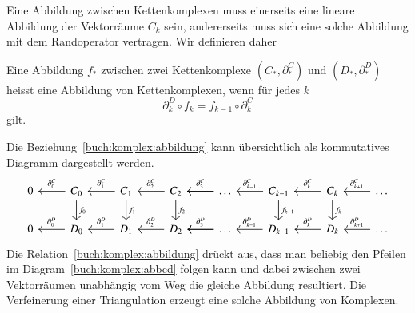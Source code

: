 Eine Abbildung zwischen Kettenkomplexen muss einerseits eine lineare
Abbildung der Vektorräume $C_k$ sein, andererseits muss sich eine
solche Abbildung mit dem Randoperator vertragen.
Wir definieren daher

\begin{definition}
\label{buch:komplex:def:abbildung}
Eine Abbildung $f_*$ zwischen zwei Kettenkomplexe $(C_*,\partial^C_*)$ und 
$(D_*,\partial^D_*)$ heisst eine Abbildung von Kettenkomplexen, wenn
für jedes $k$ 
\begin{equation}
\partial^D_k
\circ
f_{k}
=
f_{k-1}
\circ
\partial^C_k
\label{buch:komplex:abbildung}
\end{equation}
gilt.
\end{definition}

Die Beziehung~\eqref{buch:komplex:abbildung} kann übersichtlich als
kommutatives Diagramm dargestellt werden.
\begin{equation}
\begin{tikzcd}
0 
	& C_0 \arrow[l, "\partial_0^C" above]
		\arrow[d, "f_0"]
		& C_1 \arrow[l,"\partial_1^C" above]
			\arrow[d, "f_1"]
			& C_2 \arrow[l,"\partial_2^C" above]
				\arrow[d, "f_2"]
				& \dots \arrow[l]
					\arrow[l, "\partial_{3}^C" above]
					& C_{k-1}
						\arrow[l, "\partial_{k-1}^C" above]
						\arrow[d, "f_{k-1}"]
						& C_{k}\arrow[l, "\partial_{k}^C" above]
							\arrow[d, "f_{k}"]
							& \dots
								\arrow[l,"\partial_{k+1}^C" above]
\\
0 
	& D_0 \arrow[l, "\partial_0^D" above]
		& D_1 \arrow[l,"\partial_1^D" above]
			& D_2 \arrow[l,"\partial_2^D" above]
				& \dots \arrow[l]
					\arrow[l, "\partial_{3}^D" above]
					& D_{k-1}
						\arrow[l, "\partial_{k-1}^D" above]
						& D_{k}\arrow[l, "\partial_{k}^D" above]
							& \dots
								\arrow[l,"\partial_{k+1}^D" above]
\end{tikzcd}
\label{buch:komplex:abbcd}
\end{equation}
Die Relation~\eqref{buch:komplex:abbildung} drückt aus, dass man beliebig
den Pfeilen im Diagram~\eqref{buch:komplex:abbcd} folgen kann und
dabei zwischen zwei Vektorräumen unabhängig vom Weg die gleiche Abbildung
resultiert.
Die Verfeinerung einer Triangulation erzeugt eine solche Abbildung von
Komplexen.



